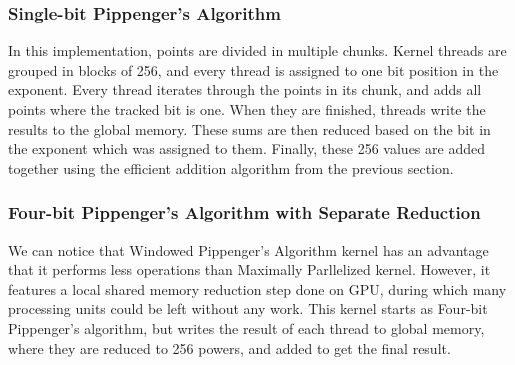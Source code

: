 \subsubsection{Single-bit Pippenger's Algorithm}
In this implementation, points are divided in multiple chunks. Kernel threads are grouped in blocks of 256, and every thread is assigned to one bit position in the exponent. Every thread iterates through the points in its chunk, and adds all points where the tracked bit is one. When they are finished, threads write the results to the global memory. These sums are then reduced based on the bit in the exponent which was assigned to them. Finally, these 256 values are added together using the efficient addition algorithm from the previous section.
\subsubsection{Four-bit Pippenger's Algorithm with Separate Reduction}
We can notice that Windowed Pippenger's Algorithm kernel has an advantage that it performs less operations than Maximally Parllelized kernel. However, it features a local shared memory reduction step done on GPU, during which many processing units could be left without any work. This kernel starts as Four-bit Pippenger's algorithm, but writes the result of each thread to global memory, where they are reduced to 256 powers, and added to get the final result.
